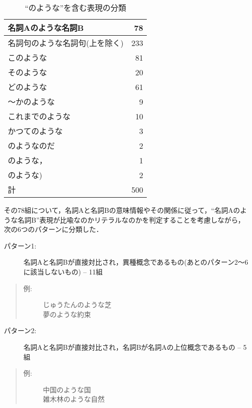 \begin{table}[htbp]
	\caption{``のような''を含む表現の分類}
	\begin{center}
	\begin{tabular}{|l|r|}
		\hline
		名詞Aのような名詞B & 78 \\
		\hline
		名詞句のような名詞句(上を除く) & 233 \\
		このような & 81 \\
		そのような & 20 \\
		どのような & 61 \\
		〜かのような & 9 \\
		これまでのような & 10 \\
		かつてのような & 3 \\
		のようなのだ & 2 \\
		のような， & 1 \\
		のような) & 2 \\
		\hline
		\hline
		計 & 500 \\
		\hline
	\end{tabular}
	\end{center}
	\label{tab:noyouna1}
\end{table}

その78組について，名詞Aと名詞Bの意味情報やその関係に従って，``名詞Aのような名詞B''表現が比喩なのかリテラルなのかを判定することを考慮しながら，次の6つのパターンに分類した．

\medskip
\begin{description}
  \item[パターン1:] 名詞Aと名詞Bが直接対比され，異種概念であるもの(あとのパターン2〜6に該当しないもの) -- 11組
\end{description}
\begin{quote}
\begin{description}
  \item[例:] じゅうたんのような芝 \\ 夢のような約束
\end{description}
\end{quote}

\medskip
\begin{description}
  \item[パターン2:] 名詞Aと名詞Bが直接対比され，名詞Bが名詞Aの上位概念であるもの -- 5組
\end{description}
\begin{quote}
\begin{description}
  \item[例:] 中国のような国 \\ 雑木林のような自然
\end{description}
\end{quote}

